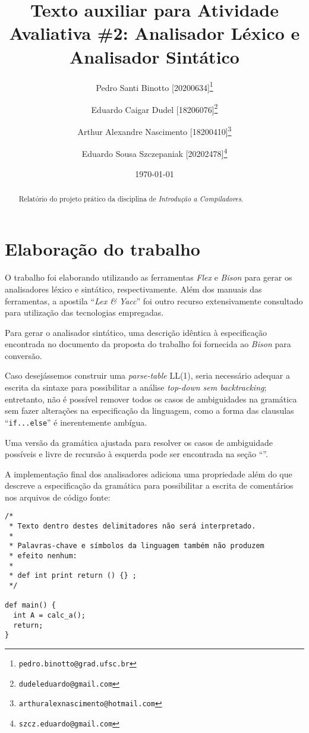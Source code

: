 \documentclass[12pt]{article}
\title{Texto auxiliar para Atividade Avaliativa \#2: Analisador Léxico e Analisador Sintático}
\author[1]{Pedro Santi Binotto [20200634]\thanks{\texttt{pedro.binotto@grad.ufsc.br}}}
\author[2]{Eduardo Caigar Dudel [18206076]\thanks{\texttt{dudeleduardo@gmail.com}}}
\author[3]{Arthur Alexandre Nascimento [18200410]\thanks{\texttt{arthuralexnascimento@hotmail.com}}}
\author[4]{Eduardo Sousa Szczepaniak [20202478]\thanks{\texttt{szcz.eduardo@gmail.com}}}
\date{\today}
\affil[1]{Departamento de Informática e Estatística, Universidade Federal de Santa Catarina}
\begin{document}
\begin{titlepage}
\maketitle
\thispagestyle{empty}

\begin{abstract}
  Relatório do projeto prático da disciplina de \textit{Introdução a Compiladores}.
\end{abstract}

\end{titlepage}

\newpage
\tableofcontents

\newpage
\section{Elaboração do trabalho}
\paragraph{}
O trabalho foi elaborando utilizando as ferramentas \textit{Flex}\cite{mitFlex1990} e \textit{Bison}\cite{mitBison1992}
para gerar os analisadores léxico e sintático, respectivamente. Além dos manuais das ferramentas, a apostila
``\textit{Lex \& Yacc}''\cite{niemannYacc} foi outro recurso extensivamente consultado para utilização das tecnologias
empregadas.

Para gerar o analisador sintático, uma descrição idêntica à especificação encontrada no documento da proposta do
trabalho foi fornecida ao \textit{Bison} para conversão. 

Caso desejássemos construir uma \textit{parse-table} LL(1), seria necessário adequar a escrita da sintaxe para
possibilitar a análise \textit{top-down sem backtracking}; entretanto, não é possível remover todos os casos de
ambiguidades na gramática sem fazer alterações na especificação da linguagem, como a forma das clausulas
``\texttt{if...else}'' é inerentemente ambígua. 

Uma versão da gramática ajustada para resolver os casos de ambiguidade possíveis e livre de recursão à esquerda pode ser
encontrada na seção ``''.

A implementação final dos analisadores adiciona uma propriedade além do que descreve a especificação da gramática para
possibilitar a escrita de comentários nos arquivos de código fonte:

\begin{verbatim}
/*
 * Texto dentro destes delimitadores não será interpretado.
 *
 * Palavras-chave e símbolos da linguagem também não produzem
 * efeito nenhum:
 *
 * def int print return () {} ;
 */

def main() {
  int A = calc_a();
  return;
}
\end{verbatim}
\end{document}
